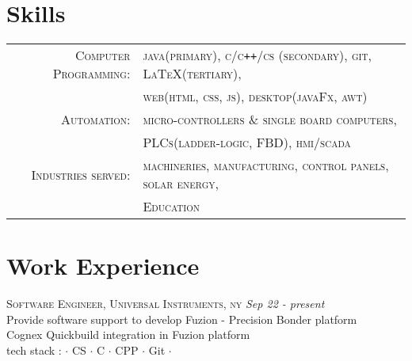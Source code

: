 \documentclass[a4paper]{article}
\begin{document}
\section{		Skills																													}
	\begin{tabular}{rl}	\small{}
	 	\small{}\textsc{		Computer Programming:	}	& \textsc{					java(primary), \small{c/c\texttt{++}/cs (secondary)}, git, \LaTeX (tertiary),	}	\\
  												& \textsc{					web(html, css, js), desktop(javaFx, awt)	} 	\\
 		\small{}\textsc{		Automation:			}	& \textsc{					micro-controllers \& single board computers,						}	\\
  												& \textsc{					PLCs(ladder-logic, FBD), hmi/scada								} 	\\
 		\small{}\textsc{		Industries served:		}	& \textsc{					machineries, manufacturing, control panels, solar energy,				}	\\
  												& \textsc{					Education													} 	\\
	\end{tabular}

\section	{	Work Experience																										}
%
\textsc	{		Software Engineer, Universal Instruments, ny																			} \hfill \emph {Sep 22 - present	}	\\
		{	\textbullet	Provide software support to develop Fuzion - Precision Bonder platform 															}	\\
		{	\textbullet	Cognex Quickbuild integration in Fuzion platform 															}	\\
		{	\textbullet tech stack  : $\cdot$	CS $\cdot$ C $\cdot$ CPP $\cdot$ Git $\cdot$												}	\\
\end{document}
